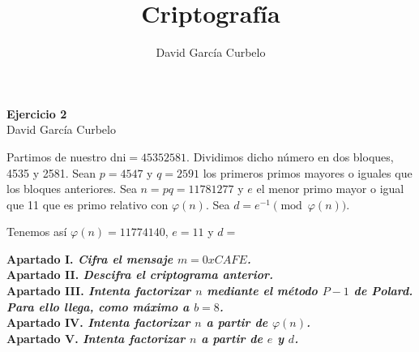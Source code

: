 \documentclass[fleqn]{article}
\author{David García Curbelo}
\title{Criptografía}
\begin{document}
    \begin{center}
        \LARGE{\textbf{Ejercicio 2}} \\
        \Large{David García Curbelo} \\
    \end{center}

    \vspace{1cm}

    Partimos de nuestro dni$= 45352581$. Dividimos dicho número en dos bloques, 4535 y 2581. Sean $p = 4547$ y $q = 2591$ los 
    primeros primos mayores o iguales que los bloques anteriores. Sea $n = pq = 11781277$ y $e$ el menor primo mayor o igual que
    11 que es primo relativo con $\varphi(n)$. Sea $d = e^{-1} \pmod{\varphi(n)}$.

    Tenemos así $\varphi(n) = 11774140$, $e = 11$ y $d = $

    \textbf{Apartado I. \textit{Cifra el mensaje $m = 0xCAFE$.}}\\

    \newpage
    \textbf{Apartado II. \textit{Descifra el criptograma anterior.}}\\

    \newpage
    \textbf{Apartado III. \textit{Intenta factorizar $n$ mediante el método $P-1$ de Polard. Para ello llega, como máximo a $b=8$.}}\\

    \newpage
    \textbf{Apartado IV. \textit{Intenta factorizar $n$ a partir de $\varphi(n)$.}}\\

    \newpage
    \textbf{Apartado V. \textit{Intenta factorizar $n$ a partir de $e$ y $d$.}}\\ 
\end{document}

